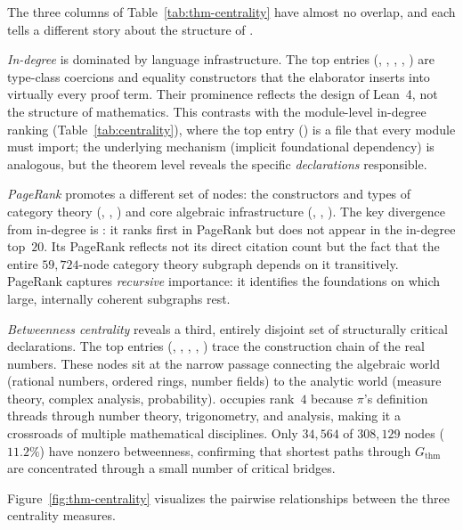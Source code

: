 The three columns of Table~\ref{tab:thm-centrality} have almost no overlap, and each tells a different story about the structure of .

\emph{In-degree} is dominated by language infrastructure. The top entries (, , , , ) are type-class coercions and equality constructors that the elaborator inserts into virtually every proof term. Their prominence reflects the design of Lean~4, not the structure of mathematics. This contrasts with the module-level in-degree ranking (Table~\ref{tab:centrality}), where the top entry () is a file that every module must import; the underlying mechanism (implicit foundational dependency) is analogous, but the theorem level reveals the specific \emph{declarations} responsible.

\emph{PageRank} promotes a different set of nodes: the constructors and types of category theory (, , ) and core algebraic infrastructure (, , ). The key divergence from in-degree is : it ranks first in PageRank but does not appear in the in-degree top~$20$. Its PageRank reflects not its direct citation count but the fact that the entire $59{,}724$-node category theory subgraph depends on it transitively. PageRank captures \emph{recursive} importance: it identifies the foundations on which large, internally coherent subgraphs rest.

\emph{Betweenness centrality} reveals a third, entirely disjoint set of structurally critical declarations. The top entries (, , , , ) trace the construction chain of the real numbers. These nodes sit at the narrow passage connecting the algebraic world (rational numbers, ordered rings, number fields) to the analytic world (measure theory, complex analysis, probability).  occupies rank~$4$ because $\pi$'s definition threads through number theory, trigonometry, and analysis, making it a crossroads of multiple mathematical disciplines. Only $34{,}564$ of $308{,}129$ nodes ($11.2\%$) have nonzero betweenness, confirming that shortest paths through $G_{\mathrm{thm}}$ are concentrated through a small number of critical bridges.

Figure~\ref{fig:thm-centrality} visualizes the pairwise relationships between the three centrality measures.

